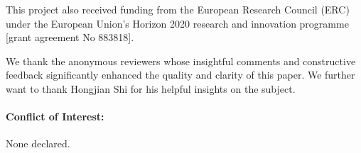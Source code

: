 \documentclass[ejs]{imsart}
\theoremstyle{plain}
\newcounter{reviewer}
\begin{document}
\noindent This project also received funding from the European Research Council (ERC) under the European Union’s Horizon 2020 research and innovation programme [grant agreement No 883818].





\begin{acks}[Acknowledgments]
    We thank the anonymous reviewers whose insightful comments and constructive feedback significantly enhanced the quality and clarity of this paper. We further want to thank Hongjian Shi for his helpful insights on the subject.\\

    \paragraph{Conflict of Interest:} None declared.
\end{acks}


%


\end{document}
